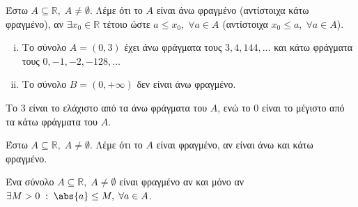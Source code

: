 \documentclass[main.tex]{subfiles}
\begin{document}
\begin{dfn}
    Έστω $ A \subseteq \mathbb{R}, \; A \neq \emptyset $. Λέμε ότι το 
    $A$ είναι άνω φραγμένο (αντίστοιχα κάτω φραγμένο), αν $ 
    \exists x_{0} \in \mathbb{R}$ τέτοιο ώστε $ a \leq x_{0}, \; 
    \forall a \in A$ (αντίστοιχα $ x_{0} \leq a, \; \forall a \in A $).
\end{dfn}

\begin{example}
\item {}
    \begin{enumerate}[i)]
        \item Το  σύνολο $ A = (0,3) $  έχει άνω φράγματα τους $ 3, 4, 144, 
            \ldots$ και κάτω φράγματα τους $ 0, -1, -2, -128, \ldots $ 

        \item Το σύνολο $ B = (0,+\infty) $ δεν είναι άνω φραγμένο.
    \end{enumerate}
\end{example}

\begin{rem}
    Το  $ 3 $ είναι το ελάχιστο από τα άνω φράγματα του $A$, ενώ το $ 0
    $ είναι το μέγιστο από τα κάτω φράγματα του $A$. 
\end{rem}


\begin{dfn}
    Έστω $ A \subseteq \mathbb{R}, \; A \neq \emptyset $. Λέμε ότι το $A$ 
    είναι φραγμένο, αν είναι άνω και κάτω φραγμένο. 
\end{dfn}

\begin{prop}
    Ένα σύνολο $ A \subseteq \mathbb{R}, \; A \neq \emptyset $ είναι 
    φραγμένο αν και μόνο αν $ \exists M>0 \; : \; \abs{a} \leq M, \; 
    \forall a \in A$.
\end{prop}
\end{document}
